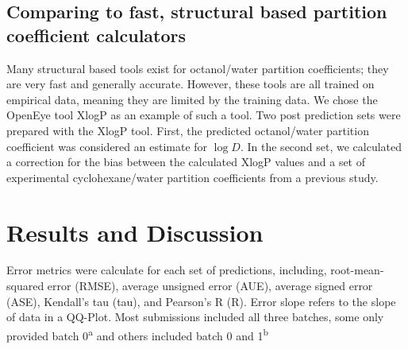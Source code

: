 \subsection{Comparing to fast, structural based partition coefficient calculators} %
\label{methods:4}
Many structural based tools exist for octanol/water partition coefficients; they are very fast and generally accurate. 
However, these tools are all trained on empirical data, meaning they are limited by the training data. 
We chose the OpenEye tool XlogP %
as an example of such a tool. 
Two post prediction sets were prepared with the XlogP tool.
First, the predicted octanol/water partition coefficient was considered an estimate for $\log D$. 
In the second set, we calculated a correction for the bias between the calculated XlogP values and a set of experimental cyclohexane/water partition coefficients from a previous study. %

\section{Results and Discussion}
\label{results:1}

\begin{table}

\label{groupStats}
\caption{Error metrics were calculate for each set of predictions, including, root-mean-squared error (RMSE), average unsigned error (AUE), average signed error (ASE), Kendall's tau (tau), and Pearson's R (R). Error slope refers to the slope of data in a QQ-Plot. Most submissions included all three batches, some only provided batch 0\textsuperscript{a} and others included batch 0 and 1\textsuperscript{b}} 
\end{table}

